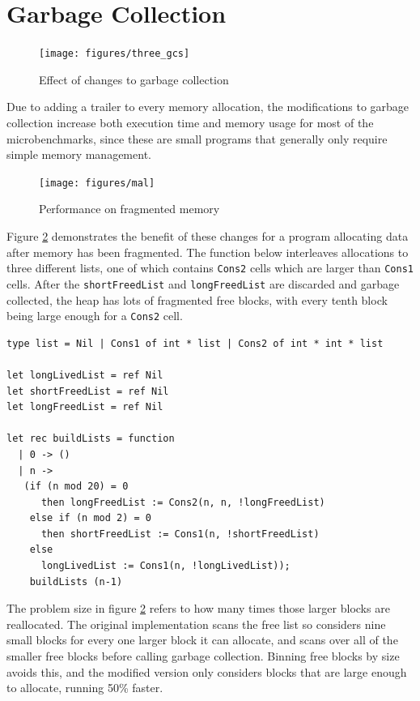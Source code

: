 


\section{Garbage Collection}

\begin{figure}[H]
\hspace{-3.3cm}
\vspace{-0.5cm}
\texttt{[image: figures/three\_gcs]}
\vspace{-0.3cm}
\caption{Effect of changes to garbage collection}
 \label{fig:three_gcs} 
\end{figure}

Due to adding a trailer to every memory allocation, the modifications to garbage collection increase both execution time and memory usage for most of the microbenchmarks, since these are small programs that generally only require simple memory management. 

\begin{figure}[H]
\hfill \texttt{[image: figures/mal]} \hfill
\caption{Performance on fragmented memory}
 \label{fig:mal} 
\end{figure}

Figure \ref{fig:mal} demonstrates the benefit of these changes for a program allocating data after memory has been fragmented. The function below interleaves allocations to three different lists, one of which contains \verb|Cons2| cells which are larger than \verb|Cons1| cells. After the \verb|shortFreedList| and \verb|longFreedList| are discarded and garbage collected, the heap has lots of fragmented free blocks, with every tenth block being large enough for a \verb|Cons2| cell. 
\begin{verbatim}
type list = Nil | Cons1 of int * list | Cons2 of int * int * list

let longLivedList = ref Nil
let shortFreedList = ref Nil
let longFreedList = ref Nil

let rec buildLists = function
  | 0 -> ()
  | n ->
   (if (n mod 20) = 0
      then longFreedList := Cons2(n, n, !longFreedList)
    else if (n mod 2) = 0
      then shortFreedList := Cons1(n, !shortFreedList)
    else 
      longLivedList := Cons1(n, !longLivedList));
    buildLists (n-1)
\end{verbatim}
The problem size in figure \ref{fig:mal} refers to how many times those larger blocks are reallocated. The original implementation scans the free list so considers nine small blocks for every one larger block it can allocate, and scans over all of the smaller free blocks before calling garbage collection. Binning free blocks by size avoids this, and the modified version only considers blocks that are large enough to allocate, running 50\% faster. 

